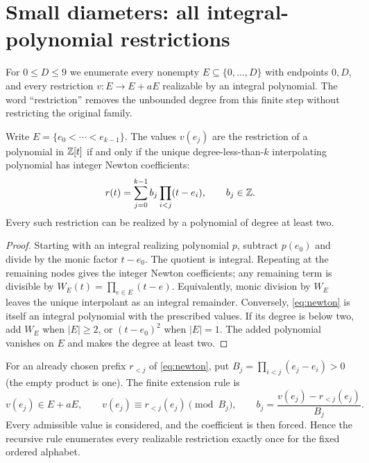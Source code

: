 \section{Small diameters: all integral-polynomial restrictions}\label{sec:small}

For $0\le D\le9$ we enumerate every nonempty
$E\subseteq\{0,\ldots,D\}$ with endpoints $0,D$, and every
restriction $v:E\to E+aE$ realizable by an integral polynomial.
The word ``restriction'' removes the unbounded degree from this
finite step without restricting the original family.

\begin{lemma}\label{lem:newton}
Write $E=\{e_0<\cdots<e_{k-1}\}$. The values $v(e_j)$ are the
restriction of a polynomial in $\mathbb Z[t]$ if and only if the unique
degree-less-than-$k$ interpolating polynomial has integer Newton
coefficients:
\begin{equation}\label{eq:newton}
 r(t)=\sum_{j=0}^{k-1}b_j\prod_{i<j}(t-e_i),\qquad b_j\in\mathbb Z.
\end{equation}
Every such restriction can be realized by a polynomial of degree
at least two.
\end{lemma}
\begin{proof}
Starting with an integral realizing polynomial $p$, subtract
$p(e_0)$ and divide by the monic factor $t-e_0$. The quotient is
integral. Repeating at the remaining nodes gives the integer Newton
coefficients; any remaining term is divisible by
$W_E(t)=\prod_{e\in E}(t-e)$. Equivalently, monic division by
$W_E$ leaves the unique interpolant as an integral remainder.
Conversely, \eqref{eq:newton} is itself an integral polynomial
with the prescribed values. If its degree is below two, add $W_E$
when $|E|\ge2$, or $(t-e_0)^2$ when $|E|=1$. The added polynomial
vanishes on $E$ and makes the degree at least two.
\end{proof}

For an already chosen prefix $r_{<j}$ of \eqref{eq:newton}, put
$B_j=\prod_{i<j}(e_j-e_i)>0$ (the empty product is one).
The finite extension rule is
\begin{equation}\label{eq:extension}
 v(e_j)\in E+aE,\qquad
 v(e_j)\equiv r_{<j}(e_j)\pmod{B_j},\qquad
 b_j=\frac{v(e_j)-r_{<j}(e_j)}{B_j}.
\end{equation}
Every admissible value is considered, and the coefficient is then
forced. Hence the recursive rule enumerates every realizable
restriction exactly once for the fixed ordered alphabet.

